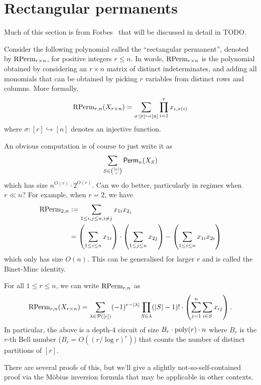 \section{Rectangular permanents}

Much of this section is from Forbes~\cite{For24} that will be discussed in detail in TODO. 

Consider the following polynomial called the ``rectangular permanent'', denoted by $\operatorname{\mathrm{RPerm}}_{r\times n}$, for positive integers $r \leq n$. In words, $\operatorname{\mathrm{RPerm}}_{r\times n}$ is the polynomial obtained by considering an $r\times n$ matrix of distinct indeterminates, and adding all monomials that can be obtained by picking $r$ variables from distinct rows and columns. More formally, 
\[
\operatorname{\mathrm{RPerm}}_{r,n}(X_{r\times n}) = \sum_{\sigma: [r] \hookrightarrow [n]} \prod_{i=1}^r x_{i, \sigma(i)}
\]
where $\sigma:[r] \hookrightarrow [n]$ denotes an injective function. 

An obvious computation is of course to just write it as 
\[
\sum_{S \in \binom{[n]}{r}}\operatorname{\mathsf{Perm}}_n(X_S)
\]
which has size $n^{O(r)} \cdot 2^{O(r)}$. Can we do better, particularly in regimes when $r \ll n$? For example, when $r = 2$, we have
\begin{align*}
\operatorname{\mathrm{RPerm}}_{2,n} & := \sum_{1 \leq i,j\leq n, i\neq j} x_{1i} x_{2_j}\\
            &  = \left(\sum_{1 \leq i \leq n} x_{1i}\right) \cdot \left(\sum_{1 \leq j \leq n} x_{2j}\right) - \left(\sum_{1 \leq i \leq n} x_{1i}x_{2i}\right)
\end{align*}
which only has size $O(n)$. This can be generalised for larger $r$ and is called the Binet-Minc identity. 

\begin{lemma}\label{lem:rectangular-perm-computation}
  For all $1 \leq r \leq n$, we can write $\operatorname{\mathrm{RPerm}}_{r,n}$ as
  \[
  \operatorname{\mathrm{RPerm}}_{r,n}(X_{r\times n}) = \sum_{\lambda \in \mathcal{P}([r])} (-1)^{r - \left|\lambda\right|} \prod_{S \in \lambda} (|S| - 1)! \cdot \left(\sum_{j=1}^n \sum_{i\in S} x_{ij}\right). 
  \]
  In particular, the above is a depth-$4$ circuit of size $B_r \cdot \operatorname{poly}(r) \cdot n$ where $B_r$ is the $r$-th Bell number ($B_r = O((r / \log r)^r)$) that counts the number of distinct partitions of $[r]$. 
\end{lemma}

There are several proofs of this, but we'll give a slightly not-so-self-contained proof via the M\"obius inversion formula that may be applicable in other contexts. 

